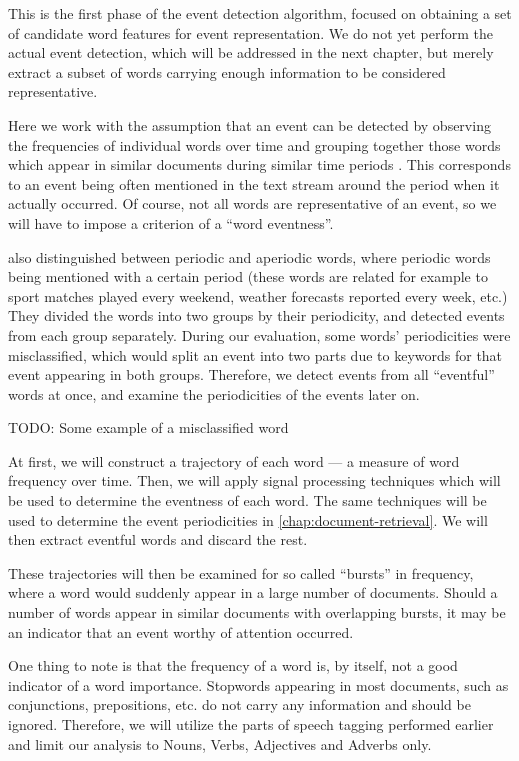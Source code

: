 This is the first phase of the event detection algorithm, focused on obtaining a set of candidate word features for event representation. We do not yet perform the actual event detection, which will be addressed in the next chapter, but merely extract a subset of words carrying enough information to be considered representative.

Here we work with the assumption that an event can be detected by observing the frequencies of individual words over time and grouping together those words which appear in similar documents during similar time periods \cite{event-detection, parameter-free}. This corresponds to an event being often mentioned in the text stream around the period when it actually occurred. Of course, not all words are representative of an event, so we will have to impose a criterion of a ``word eventness''.

\cite{event-detection} also distinguished between periodic and aperiodic words, where periodic words being mentioned with a certain period (these words are related for example to sport matches played every weekend, weather forecasts reported every week, etc.) They divided the words into two groups by their periodicity, and detected events from each group separately. During our evaluation, some words' periodicities were misclassified, which would split an event into two parts due to keywords for that event appearing in both groups. Therefore, we detect events from all ``eventful'' words at once, and examine the periodicities of the events later on.

{\color{red} TODO: Some example of a misclassified word}

At first, we will construct a trajectory of each word --- a measure of word frequency over time. Then, we will apply signal processing techniques which will be used to determine the eventness of each word. The same techniques will be used to determine the event periodicities in \autoref{chap:document-retrieval}. We will then extract eventful words and discard the rest.

These trajectories will then be examined for so called ``bursts'' in frequency, where a word would suddenly appear in a large number of documents. Should a number of words appear in similar documents with overlapping bursts, it may be an indicator that an event worthy of attention occurred.

One thing to note is that the frequency of a word is, by itself, not a good indicator of a word importance.
Stopwords appearing in most documents, such as conjunctions, prepositions, etc. do not carry any information and should be ignored. Therefore, we will utilize the parts of speech tagging performed earlier and limit our analysis to Nouns, Verbs, Adjectives and Adverbs only.

